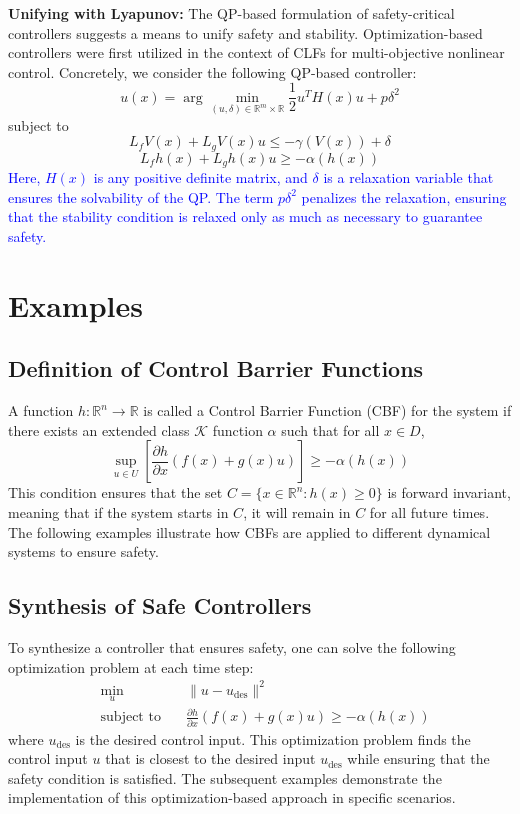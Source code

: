 \documentclass[12pt]{article}
\begin{document}
\textbf{Unifying with Lyapunov:}
The QP-based formulation of safety-critical controllers suggests a means to unify safety and stability. Optimization-based controllers were first utilized in the context of CLFs for multi-objective nonlinear control. Concretely, we consider the following QP-based controller:
\[
u(x) = \arg\min_{(u, \delta) \in \mathbb{R}^m \times \mathbb{R}} \frac{1}{2} u^T H(x) u + p \delta^2
\]
subject to
\[
L_f V(x) + L_g V(x) u \leq -\gamma(V(x)) + \delta
\]
\[
L_f h(x) + L_g h(x) u \geq -\alpha(h(x))
\]
\textcolor{blue}{
Here, \( H(x) \) is any positive definite matrix, and \( \delta \) is a relaxation variable that ensures the solvability of the QP. The term \( p \delta^2 \) penalizes the relaxation, ensuring that the stability condition is relaxed only as much as necessary to guarantee safety.
}

\section{Examples}
\subsection{Definition of Control Barrier Functions}
A function \( h : \mathbb{R}^n \to \mathbb{R} \) is called a Control Barrier Function (CBF) for the system if there exists an extended class \( \mathcal{K} \) function \( \alpha \) such that for all \( x \in D \),
\[
\sup_{u \in U} \left[ \frac{\partial h}{\partial x} (f(x) + g(x)u) \right] \geq -\alpha(h(x))
\]
This condition ensures that the set \( C = \{ x \in \mathbb{R}^n : h(x) \geq 0 \} \) is forward invariant, meaning that if the system starts in \( C \), it will remain in \( C \) for all future times. The following examples illustrate how CBFs are applied to different dynamical systems to ensure safety.

\subsection{Synthesis of Safe Controllers}
To synthesize a controller that ensures safety, one can solve the following optimization problem at each time step:
\[
\begin{aligned}
& \min_u \quad & \| u - u_{\text{des}} \|^2 \\
& \text{subject to} \quad & \frac{\partial h}{\partial x} (f(x) + g(x)u) \geq -\alpha(h(x))
\end{aligned}
\]
where \( u_{\text{des}} \) is the desired control input. This optimization problem finds the control input \( u \) that is closest to the desired input \( u_{\text{des}} \) while ensuring that the safety condition is satisfied. The subsequent examples demonstrate the implementation of this optimization-based approach in specific scenarios.
\end{document}
